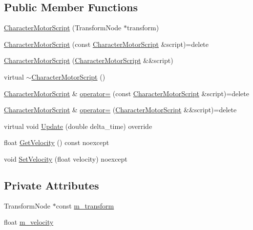 \subsection*{Public Member Functions}
\begin{DoxyCompactItemize}
\item 
\hyperlink{classmage_1_1_character_motor_script_a3ec398d61411a1d8adaf330f00fdd7ea}{Character\+Motor\+Script} (Transform\+Node $\ast$transform)
\item 
\hyperlink{classmage_1_1_character_motor_script_aa8b4b2c6eba7077677db51e24c2a9a36}{Character\+Motor\+Script} (const \hyperlink{classmage_1_1_character_motor_script}{Character\+Motor\+Script} \&script)=delete
\item 
\hyperlink{classmage_1_1_character_motor_script_a04180b7c00a5c1c309fe8b1b44f6fd10}{Character\+Motor\+Script} (\hyperlink{classmage_1_1_character_motor_script}{Character\+Motor\+Script} \&\&script)
\item 
virtual \hyperlink{classmage_1_1_character_motor_script_a97b98828d964a0ce38cc424bbf080303}{$\sim$\+Character\+Motor\+Script} ()
\item 
\hyperlink{classmage_1_1_character_motor_script}{Character\+Motor\+Script} \& \hyperlink{classmage_1_1_character_motor_script_a5b66cbbe6b829fe56a1bba5f9093b36e}{operator=} (const \hyperlink{classmage_1_1_character_motor_script}{Character\+Motor\+Script} \&script)=delete
\item 
\hyperlink{classmage_1_1_character_motor_script}{Character\+Motor\+Script} \& \hyperlink{classmage_1_1_character_motor_script_a05e8822fa633d8642702d125b26069f7}{operator=} (\hyperlink{classmage_1_1_character_motor_script}{Character\+Motor\+Script} \&\&script)=delete
\item 
virtual void \hyperlink{classmage_1_1_character_motor_script_af09581e810c02ca4a19ecbaf0d7580bb}{Update} (double delta\+\_\+time) override
\item 
float \hyperlink{classmage_1_1_character_motor_script_a61ccbe24d365ed6b5ed1ddb4f4b342cb}{Get\+Velocity} () const noexcept
\item 
void \hyperlink{classmage_1_1_character_motor_script_a3e2290275845269c405533ce7b5c6c4c}{Set\+Velocity} (float velocity) noexcept
\end{DoxyCompactItemize}
\subsection*{Private Attributes}
\begin{DoxyCompactItemize}
\item 
Transform\+Node $\ast$const \hyperlink{classmage_1_1_character_motor_script_ab73049127363ded0e6e8fb474b51794e}{m\+\_\+transform}
\item 
float \hyperlink{classmage_1_1_character_motor_script_a02441cc4c84ba12811845b7f966f4069}{m\+\_\+velocity}
\end{DoxyCompactItemize}
